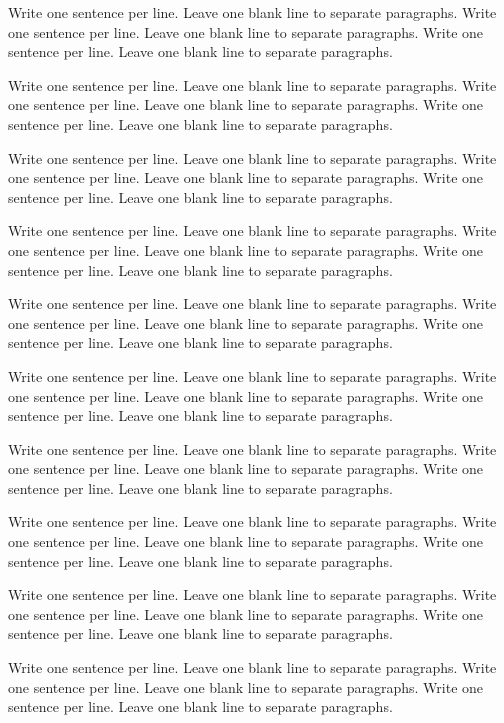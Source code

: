 \documentclass[a4paper, nobind]{templates/ociamthesis}
\begin{document}
Write one sentence per line.
Leave one blank line to separate paragraphs.
Write one sentence per line.
Leave one blank line to separate paragraphs.
Write one sentence per line.
Leave one blank line to separate paragraphs.

Write one sentence per line.
Leave one blank line to separate paragraphs.
Write one sentence per line.
Leave one blank line to separate paragraphs.
Write one sentence per line.
Leave one blank line to separate paragraphs.

Write one sentence per line.
Leave one blank line to separate paragraphs.
Write one sentence per line.
Leave one blank line to separate paragraphs.
Write one sentence per line.
Leave one blank line to separate paragraphs.

Write one sentence per line.
Leave one blank line to separate paragraphs.
Write one sentence per line.
Leave one blank line to separate paragraphs.
Write one sentence per line.
Leave one blank line to separate paragraphs.

Write one sentence per line.
Leave one blank line to separate paragraphs.
Write one sentence per line.
Leave one blank line to separate paragraphs.
Write one sentence per line.
Leave one blank line to separate paragraphs.

Write one sentence per line.
Leave one blank line to separate paragraphs.
Write one sentence per line.
Leave one blank line to separate paragraphs.
Write one sentence per line.
Leave one blank line to separate paragraphs.

Write one sentence per line.
Leave one blank line to separate paragraphs.
Write one sentence per line.
Leave one blank line to separate paragraphs.
Write one sentence per line.
Leave one blank line to separate paragraphs.

Write one sentence per line.
Leave one blank line to separate paragraphs.
Write one sentence per line.
Leave one blank line to separate paragraphs.
Write one sentence per line.
Leave one blank line to separate paragraphs.

Write one sentence per line.
Leave one blank line to separate paragraphs.
Write one sentence per line.
Leave one blank line to separate paragraphs.
Write one sentence per line.
Leave one blank line to separate paragraphs.

Write one sentence per line.
Leave one blank line to separate paragraphs.
Write one sentence per line.
Leave one blank line to separate paragraphs.
Write one sentence per line.
Leave one blank line to separate paragraphs.
\end{document}
